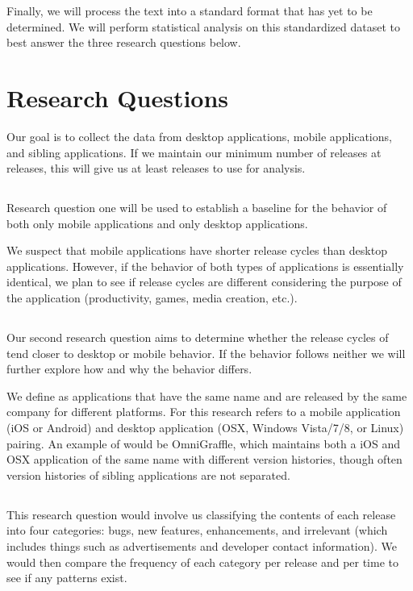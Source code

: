 \documentclass{acm_proc_article-sp}
\begin{document}
Finally, we will process the text into a standard format that has yet to be determined. 
We will perform statistical analysis on this standardized dataset to best answer the three research questions below.
\section{Research Questions}
Our goal is to collect the data from \NumDesktopApps desktop applications, \NumMobileApps mobile applications, and \NumSiblingpApps sibling applications. 
If we maintain our minimum number of releases at \MinNumReleases releases, this will give us at least \TotalNumReleases releases to use for analysis.

\subsection{\RQOne }
Research question one will be used to establish a baseline for the behavior of both only mobile applications and only desktop applications.

We suspect that mobile applications have shorter release cycles than desktop applications.
However, if the behavior of both types of applications is essentially identical, we plan to see if release cycles are different considering the purpose of the application (\eg productivity, games, media creation, etc.).

\subsection{\RQTwo }
Our second research question aims to determine whether the release cycles of \sibs tend closer to desktop or mobile behavior. 
If the behavior follows neither we will further explore how and why the behavior differs.

We define \sibs as applications that have the same name and are released by the same company for different platforms. 
For this research \sibs refers to a mobile application (iOS or Android) and desktop application (OSX, Windows Vista/7/8, or Linux) pairing.
An example of \sibs would be OmniGraffle, which maintains both a iOS and OSX application of the same name with different version histories, though often version histories of sibling applications are not separated.


\subsection{\RQThree }
This research question would involve us classifying the contents of each release into four categories: bugs, new features, enhancements, and irrelevant (which includes things such as advertisements and developer contact information).
We would then compare the frequency of each category per release and per time to see if any patterns exist.
\end{document}
